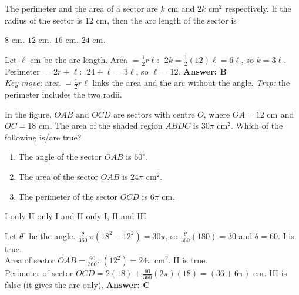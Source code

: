 \documentclass[11pt,addpoints]{exam}
\newcommand{\cm}[1]{\text{ cm}^{#1}}
\begin{document}
\begin{questions}
The perimeter and the area of a sector are $k\cm{}$ and $2k\cm2$ respectively. If the radius of the sector is $12\cm{}$, then the arc length of the sector is
\begin{oneparchoices}
  \choice $8\cm{}$. \CorrectChoice $12\cm{}$. \choice $16\cm{}$. \choice $24\cm{}$.
\end{oneparchoices}
\begin{solution}
Let $\ell\cm{}$ be the arc length. Area $= \frac12 r\ell$: $\;2k = \frac12(12)\ell = 6\ell$, so $k = 3\ell$.\\
Perimeter $= 2r + \ell$: $\;24 + \ell = 3\ell$, so $\ell = 12$. \quad \textbf{Answer: B} \\
\emph{Key move:} area $= \frac12 r\ell$ links the area and the arc without the angle. \emph{Trap:} the perimeter includes the two radii.
\end{solution}

\begin{minipage}[t]{0.7\linewidth}
In the figure, $OAB$ and $OCD$ are sectors with centre $O$, where $OA = 12\cm{}$ and $OC = 18\cm{}$. The area of the shaded region $ABDC$ is $30\pi\cm2$. Which of the following is/are true?
\begin{enumerate}[label=\Roman*., leftmargin=2.2em, nosep]
\item The angle of the sector $OAB$ is $60^\circ$.
\item The area of the sector $OAB$ is $24\pi\cm2$.
\item The perimeter of the sector $OCD$ is $6\pi\cm{}$.
\end{enumerate}
\begin{oneparchoices}
  \choice I only \choice II only \CorrectChoice I and II only \choice I, II and III
\end{oneparchoices}
\end{minipage}\hfill
\begin{minipage}[t]{0.26\linewidth}
\vspace{-6pt}\centering
{}
\end{minipage}
\begin{solution}
Let $\theta^\circ$ be the angle. $\frac{\theta}{360}\,\pi(18^2 - 12^2) = 30\pi$, so $\frac{\theta}{360}(180) = 30$ and $\theta = 60$. \;I is true.\\
Area of sector $OAB = \frac{60}{360}\pi(12^2) = 24\pi\cm2$. \;II is true.\\
Perimeter of sector $OCD = 2(18) + \frac{60}{360}(2\pi)(18) = (36 + 6\pi)\cm{}$. \;III is false (it gives the arc only). \quad \textbf{Answer: C} 
\end{solution}


\end{questions}
\end{document}
